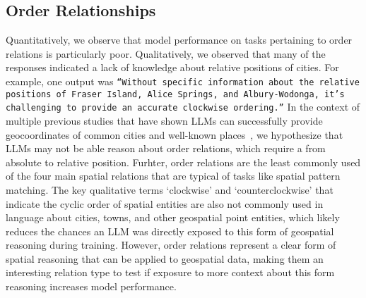 \subsection{Order Relationships}
Quantitatively, we observe that model performance on tasks pertaining to order relations is particularly poor.
Qualitatively, we observed that many of the responses indicated a lack of knowledge about relative positions of cities.
For example, one output was 
\texttt{``Without specific information about the relative positions of Fraser Island, Alice Springs, and Albury-Wodonga, it's challenging to provide an accurate clockwise ordering.''}
In the context of multiple previous studies that have shown LLMs can successfully provide geocoordinates of common cities and well-known places~\cite{Bhandari2023,Qi2023}, we hypothesize that LLMs may not be able reason about order relations, which require a from absolute to relative position. 
Furhter, order relations are the least commonly used of the four main spatial relations that are typical of tasks like spatial pattern matching.
The key qualitative terms `clockwise' and `counterclockwise' that indicate the cyclic order of spatial entities are also not commonly used in language about cities, towns, and other geospatial point entities, which likely reduces the chances an LLM was directly exposed to this form of geospatial reasoning during training.
However, order relations represent a clear form of spatial reasoning that can be applied to geospatial data, making them an interesting relation type to test if exposure to more context about this form reasoning increases model performance.


